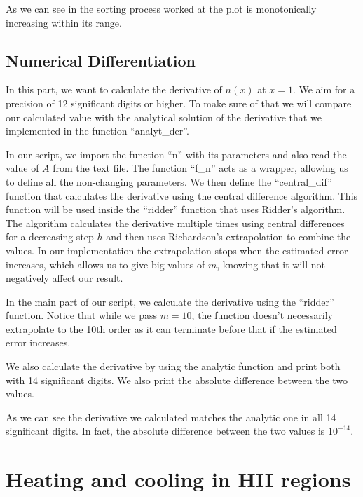 \documentclass[a4paper,10pt]{article}
\begin{document}
As we can see in  the sorting process worked at the plot is monotonically increasing within its range. 


\subsection{Numerical Differentiation}

In this part, we want to calculate the derivative of $n(x)$ at $x=1$. We aim for a precision of 12 significant digits or higher. To make sure of that we will compare our calculated value with the analytical solution of the derivative that we implemented in the function ``analyt\_der''. 

In our script, we import the function ``n'' with its parameters and also read the value of $A$ from the text file. The function ``f\_n'' acts as a wrapper, allowing us to define all the non-changing parameters. We then define the ``central\_dif'' function that calculates the derivative using the central difference algorithm. This function will be used inside the ``ridder'' function that uses Ridder's algorithm. The algorithm calculates the derivative multiple times using central differences for a decreasing step $h$ and then uses Richardson's extrapolation to combine the values. In our implementation the extrapolation stops when the estimated error increases, which allows us to give big values of $m$, knowing that it will not negatively affect our result.



In the main part of our script, we calculate the derivative using the ``ridder'' function. Notice that while we pass $m=10$, the function doesn't necessarily extrapolate to the 10th order as it can terminate before that if the estimated error increases. 

We also calculate the derivative by using the analytic function and print both with 14 significant digits. We also print the absolute difference between the two values.  



As we can see the derivative we calculated matches the analytic one in all 14 significant digits. In fact, the absolute difference between the two values is $10^{-14}$. 

\section{Heating and cooling in HII regions}
\end{document}
